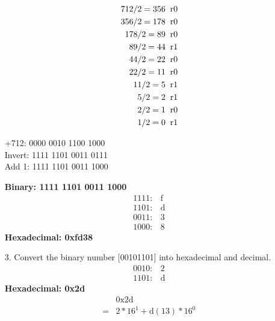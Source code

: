 \documentclass{article}
\begin{document}
\begin{itemize}
\begin{align}
        712/2=356 \hspace{0.2cm}&\text{r}0 \nonumber\\
        356/2=178 \hspace{0.2cm}&\text{r}0 \nonumber\\
        178/2=89 \hspace{0.2cm}&\text{r}0 \nonumber\\
        89/2=44 \hspace{0.2cm}&\text{r}1 \nonumber\\
        44/2=22 \hspace{0.2cm}&\text{r}0 \nonumber\\
        22/2=11 \hspace{0.2cm}&\text{r}0 \nonumber\\
        11/2=5 \hspace{0.2cm}&\text{r}1 \nonumber\\
        5/2=2 \hspace{0.2cm}&\text{r}1 \nonumber\\
        2/2=1 \hspace{0.2cm}&\text{r}0 \nonumber\\
        1/2=0 \hspace{0.2cm}&\text{r}1 \nonumber
    \end{align}
    \begin{center}
        +712: 0000 0010 1100 1000\\
        Invert: 1111 1101 0011 0111\\
        Add 1: 1111 1101 0011 1000
    \end{center}
    \textbf{Binary: 1111 1101 0011 1000}
    \begin{align}
        1111: &\text{f}\nonumber\\
        1101: &\text{d}\nonumber\\
        0011: &3\nonumber\\
        1000: &8\nonumber
    \end{align}
    \textbf{Hexadecimal: 0xfd38}
    \item[3.] Convert the binary number [00101101] into hexadecimal and decimal.
    \begin{align}
        0010: &2\nonumber\\
        1101: &\text{d}\nonumber
    \end{align}
    \textbf{Hexadecimal: 0x2d}
    \begin{align}
        &0\text{x}2\text{d}\nonumber\\
        =&2*16^1+\text{d}(13)*16^0\nonumber\\

\end{align}
\end{itemize}
\end{document}
